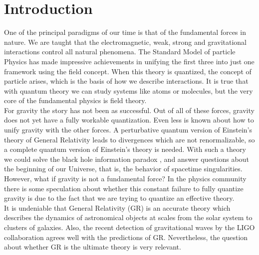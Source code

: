 \documentclass[nofootinbib,aps,prd,preprint,groupedaddress,showpacs,showkeys]{revtex4-1}
\begin{document}
\maketitle


\section{\label{sec:level1}Introduction}

\noindent One of the principal paradigms of our time is that of the fundamental forces in nature. We are taught that the electromagnetic, weak, strong and gravitational interactions control all natural phenomena. The Standard Model of particle Physics has made impressive achievements in unifying the first three into just one framework using the field concept. When this theory is quantized, the concept of particle arises, which is the basis of how we describe interactions. It is true that with quantum theory we can study systems like atoms or molecules, but the very core of the fundamental physics is field theory.\\
\indent For gravity the story has not been as successful. Out of all of these forces, gravity does not yet have a fully workable quantization. Even less is known about how to unify gravity with the other forces. A perturbative quantum version of Einstein's theory of General Relativity leads to divergences which are not renormalizable, so a complete quantum version of Einstein's theory is needed. With such a theory we could solve the black hole information paradox \cite{Hawking3}, and answer questions about the beginning of our Universe, that is, the behavior of spacetime singularities. However, what if gravity is not a fundamental force? In the physics community there is some speculation about whether this constant failure to fully quantize gravity is due to the fact that we are trying to quantize an effective theory.\\
\indent It is undeniable that General Relativity (GR) is an accurate theory which describes the dynamics of astronomical objects at scales from the solar system to clusters of galaxies. Also, the recent detection of gravitational waves by the LIGO \cite{LIGO} collaboration agrees well with the predictions of GR. Nevertheless, the question about whether GR is the ultimate theory is very relevant.\\
\end{document}
